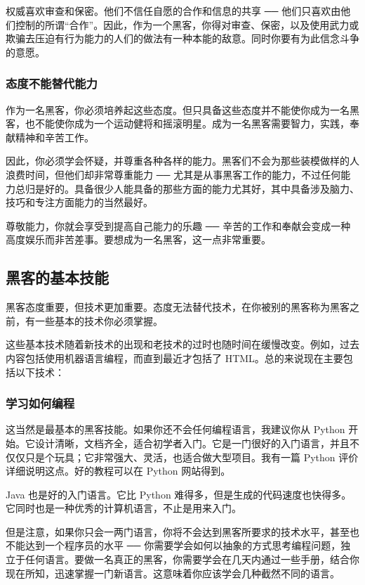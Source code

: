 权威喜欢审查和保密。他们不信任自愿的合作和信息的共享 ── 他们只喜欢由他们控制的所谓“合作”。因此，作为一个黑客，你得对审查、保密，以及使用武力或欺骗去压迫有行为能力的人们的做法有一种本能的敌意。同时你要有为此信念斗争的意愿。


\subsubsection{态度不能替代能力}
作为一名黑客，你必须培养起这些态度。但只具备这些态度并不能使你成为一名黑客，也不能使你成为一个运动健将和摇滚明星。成为一名黑客需要智力，实践，奉献精神和辛苦工作。

因此，你必须学会怀疑，并尊重各种各样的能力。黑客们不会为那些装模做样的人浪费时间，但他们却非常尊重能力 ── 尤其是从事黑客工作的能力，不过任何能力总归是好的。具备很少人能具备的那些方面的能力尤其好，其中具备涉及脑力、技巧和专注方面能力的当然最好。

尊敬能力，你就会享受到提高自己能力的乐趣 ── 辛苦的工作和奉献会变成一种高度娱乐而非苦差事。要想成为一名黑客，这一点非常重要。


\subsection{黑客的基本技能}
黑客态度重要，但技术更加重要。态度无法替代技术，在你被别的黑客称为黑客之前，有一些基本的技术你必须掌握。

这些基本技术随着新技术的出现和老技术的过时也随时间在缓慢改变。例如，过去内容包括使用机器语言编程，而直到最近才包括了 HTML。总的来说现在主要包括以下技术：


\subsubsection{学习如何编程}
这当然是最基本的黑客技能。如果你还不会任何编程语言，我建议你从 Python 开始。它设计清晰，文档齐全，适合初学者入门。它是一门很好的入门语言，并且不仅仅只是个玩具；它非常强大、灵活，也适合做大型项目。我有一篇 Python 评价详细说明这点。好的教程可以在 Python 网站得到。

Java 也是好的入门语言。它比 Python 难得多，但是生成的代码速度也快得多。它同时也是一种优秀的计算机语言，不止是用来入门。

但是注意，如果你只会一两门语言，你将不会达到黑客所要求的技术水平，甚至也不能达到一个程序员的水平 ── 你需要学会如何以抽象的方式思考编程问题，独立于任何语言。要做一名真正的黑客，你需要学会在几天内通过一些手册，结合你现在所知，迅速掌握一门新语言。这意味着你应该学会几种截然不同的语言。


